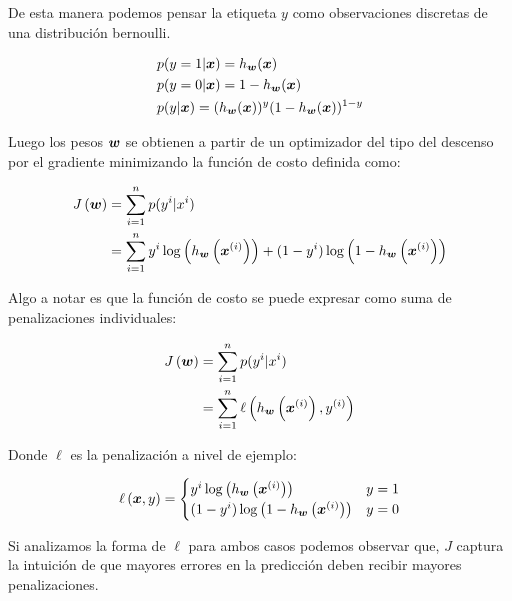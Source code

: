De esta manera podemos pensar la etiqueta $y$ como observaciones discretas de una
distribución bernoulli.

\begin{align*}
    & p(y = 1 | \boldsymbol{x}) = h_{\boldsymbol{w}}(\boldsymbol{x}) \\
    & p(y = 0 | \boldsymbol{x}) = 1 - h_{\boldsymbol{w}}(\boldsymbol{x}) \\
    & p(y | \boldsymbol{x}) = (h_{\boldsymbol{w}}(\boldsymbol{x}))^{y}(1 - h_{\boldsymbol{w}}(\boldsymbol{x}))^{1 - y} \\
\end{align*}

Luego los pesos $\boldsymbol{w}$ se obtienen a partir de un optimizador del tipo del
descenso por el gradiente minimizando la función de costo definida como:

\begin{align*}
    J\left( \boldsymbol{w} \right) &= \sum_{i=1}^{n} p(y^{i} | x^{i}) \\
                             &= \sum_{i=1}^{n}
                                    y^{i}\log\left( h_{\boldsymbol{w}}\left( \boldsymbol{x}^{(i)} \right) \right) +
                                    (1 - y^{i})\log\left(1 - h_{\boldsymbol{w}}\left( \boldsymbol{x}^{(i)} \right) \right)
\end{align*}

Algo a notar es que la función de costo se puede expresar como suma de penalizaciones
individuales:

\begin{align*}
    J\left( \boldsymbol{w} \right) &= \sum_{i=1}^{n} p(y^{i} | x^{i}) \\
                             &= \sum_{i=1}^{n} \ell\left( h_{\boldsymbol{w}}\left( \boldsymbol{x}^{(i)}\right), y^{(i)}\right)
\end{align*}

Donde $\ell$ es la penalización a nivel de ejemplo:

\begin{align*}
    \ell\left( \boldsymbol{x}, y \right) =
    \begin{cases}
        y^{i}\log\left( h_{\boldsymbol{w}}\left( \boldsymbol{x}^{(i)} \right) \right) & y = 1 \\
        (1 - y^{i})\log\left(1 - h_{\boldsymbol{w}}\left( \boldsymbol{x}^{(i)} \right) \right) & y = 0
    \end{cases}
\end{align*}

Si analizamos la forma de $\ell$ para ambos casos podemos observar que, $J$
captura la intuición de que mayores errores en la predicción deben recibir
mayores penalizaciones.

